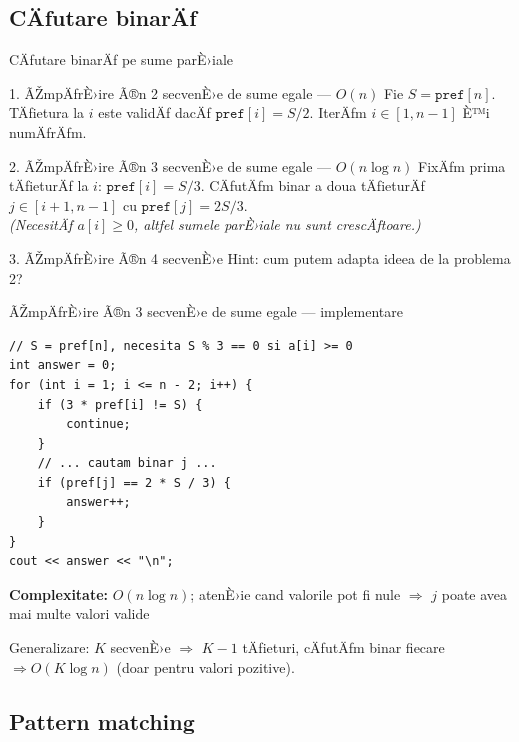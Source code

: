 \documentclass{beamer}
\begin{document}
\subsection{CÄƒutare binarÄƒ}

\begin{frame}{CÄƒutare binarÄƒ pe sume parÈ›iale}
  \begin{block}{1. ÃŽmpÄƒrÈ›ire Ã®n 2 secvenÈ›e de sume egale --- $O(n)$}
    Fie $S = \texttt{pref}[n]$. TÄƒietura la $i$ este validÄƒ dacÄƒ $\texttt{pref}[i] = S/2$.
    IterÄƒm $i \in [1, n{-}1]$ È™i numÄƒrÄƒm.
  \end{block}
  \begin{block}{2. ÃŽmpÄƒrÈ›ire Ã®n 3 secvenÈ›e de sume egale --- $O(n \log n)$}
    FixÄƒm prima tÄƒieturÄƒ la $i$: $\texttt{pref}[i] = S/3$.
    CÄƒutÄƒm binar a doua tÄƒieturÄƒ $j \in [i{+}1, n{-}1]$ cu $\texttt{pref}[j] = 2S/3$.\\
    \textit{(NecesitÄƒ $a[i] \geq 0$, altfel sumele parÈ›iale nu sunt crescÄƒtoare.)}
  \end{block}
  \begin{alertblock}{3. ÃŽmpÄƒrÈ›ire Ã®n 4 secvenÈ›e}
    Hint: cum putem adapta ideea de la problema 2?
  \end{alertblock}
\end{frame}

\begin{frame}{ÃŽmpÄƒrÈ›ire Ã®n 3 secvenÈ›e de sume egale --- implementare}
  \begin{lstlisting}
// S = pref[n], necesita S % 3 == 0 si a[i] >= 0
int answer = 0;
for (int i = 1; i <= n - 2; i++) {
    if (3 * pref[i] != S) {
        continue;
    }
    // ... cautam binar j ...
    if (pref[j] == 2 * S / 3) {
        answer++;
    }
}
cout << answer << "\n";
  \end{lstlisting}
  \textbf{Complexitate:} $O(n \log n)$; atenÈ›ie cand valorile pot fi nule $\Rightarrow$ $j$ poate avea mai multe valori valide

    Generalizare: $K$ secvenÈ›e $\Rightarrow$ $K{-}1$ tÄƒieturi, cÄƒutÄƒm binar fiecare $\Rightarrow O(K \log n)$ (doar pentru valori pozitive).
\end{frame}

\subsection{Pattern matching}
\end{document}
